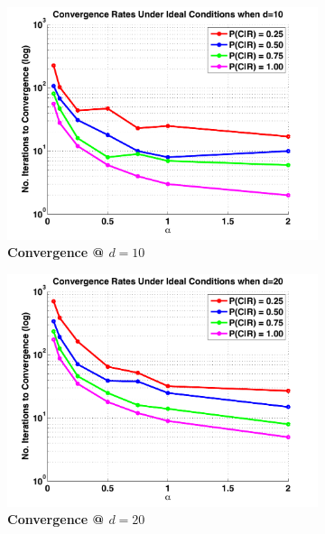 \begin{figure}
	\begin{subfigure}{.33\textwidth}
	  \centering
	  \includegraphics[width=\textwidth]{pics/perfect/simple_multiplicative_d10.pdf}
	  \caption{\textbf{Convergence @ $d=10$}}
	  \label{fig:sub1}
	\end{subfigure}%
	\begin{subfigure}{.33\textwidth}
	  \centering
	  \includegraphics[width=\textwidth]{pics/perfect/simple_multiplicative_d20.pdf}
	  \caption{\textbf{Convergence @ $d=20$}}
	  \label{fig:sub2}
	\end{subfigure}
	\begin{subfigure}{.33\textwidth}
	  \centering

\end{subfigure}
\end{figure}
